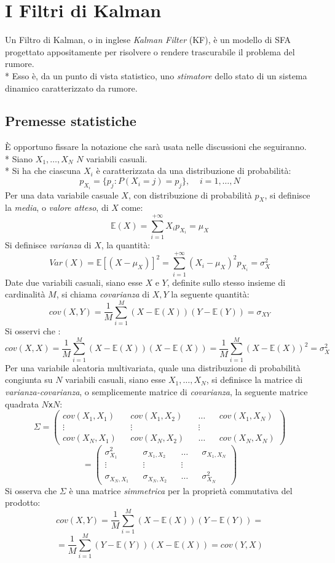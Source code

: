 \section{I Filtri di Kalman}
Un Filtro di Kalman, o in inglese \emph{Kalman Filter} (KF), \`e un modello di SFA progettato appositamente per risolvere o rendere trascurabile il problema del rumore.\\*
Esso \`e, da un punto di vista statistico, uno \emph{stimatore} dello stato di un sistema dinamico caratterizzato da rumore.
\subsection{Premesse statistiche}
\`E opportuno fissare la notazione che sar\`a usata nelle discussioni che seguiranno.\\*
Siano $X_1,\dots,X_N$ $N$ variabili casuali.\\*
Si ha che ciascuna $X_i$ \`e caratterizzata da una distribuzione di probabilit\`a:
$$
p_{X_i} = \{p_j:P(X_i = j) = p_j\},\;\;\;\;i = 1,\dots,N
$$
Per una data variabile casuale $X$, con distribuzione di probabilit\`a $p_X$, si definisce la \emph{media}, o \emph{valore atteso}, di $X$ come:
$$
\mathbb{E}(X) = \sum_{i=1}^{+\infty} X_i p_{X_i} = \mu_X
$$
Si definisce \emph{varianza} di $X$, la quantit\`a:
$$
Var(X) = \mathbb{E}[(X-\mu_X)]^2 = \sum_{i=1}^{+\infty} (X_i - \mu_X)^2p_{X_i} = \sigma^2_X
$$
Date due variabili casuali, siano esse $X$ e $Y$, definite sullo stesso insieme di cardinalit\`a $M$, si chiama \emph{covarianza} di $X,Y$ la seguente quantit\`a:
$$
cov(X,Y) = \frac{1}{M}\sum_{i=1}^M (X-\mathbb{E}(X))(Y-\mathbb{E}(Y)) = \sigma_{XY}
$$
Si osservi che :
$$
cov(X,X) =  \frac{1}{M}\sum_{i=1}^M (X-\mathbb{E}(X))(X-\mathbb{E}(X)) =  \frac{1}{M}\sum_{i=1}^M (X-\mathbb{E}(X))^2 = \sigma^2_X
$$
Per una variabile aleatoria multivariata, quale una distribuzione di probabilit\`a congiunta su $N$ variabili casuali, siano esse $X_1,\dots,X_N$, si definisce la matrice di \emph{varianza-covarianza}, o semplicemente matrice di \emph{covarianza}, la seguente matrice quadrata $N$\texttt{x}$N$:
$$
\Sigma = \left(\begin{matrix}
cov(X_1,X_1) && cov(X_1,X_2) && \dots && cov(X_1,X_N) \\
\vdots && \vdots && \vdots \\
cov(X_N,X_1) && cov(X_N, X_2) && \dots && cov(X_N,X_N)
\end{matrix}\right) 
$$
$$
 = \left(\begin{matrix}
\sigma^2_{X_1} && \sigma_{X_1,X_2} && \dots && \sigma_{X_1,X_N} \\
\vdots && \vdots && \vdots \\
\sigma_{X_N,X_1} && \sigma_{X_N, X_2} && \dots && \sigma^2_{X_N}
\end{matrix}\right)
$$
Si osserva che $\Sigma$ \`e una matrice \emph{simmetrica} per la propriet\`a commutativa del prodotto:
$$
cov(X,Y) = \frac{1}{M}\sum_{i=1}^M (X-\mathbb{E}(X))(Y-\mathbb{E}(Y)) = 
$$
$$
 = \frac{1}{M}\sum_{i=1}^M (Y-\mathbb{E}(Y))(X-\mathbb{E}(X)) = cov(Y,X)
$$
